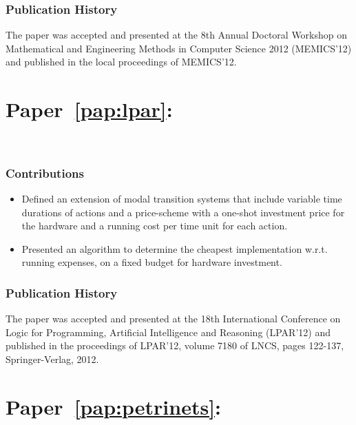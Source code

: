 \subsubsection*{Publication History}

The paper was accepted and presented at the 8th Annual Doctoral Workshop on Mathematical and Engineering Methods in Computer Science 2012 (MEMICS'12) and published in the local proceedings of MEMICS'12.


\newpage

\section*{Paper~\ref{pap:lpar}: \lpar}
\nikola \jan \kim \\ \mhm \jiri
\vspace{3mm}

\noindent

\subsubsection*{Contributions}

\begin{itemize}
\item Defined an extension of modal transition systems that include variable time durations of actions and a price-scheme with a one-shot investment price for the hardware and a running cost per time unit for each action.
\item Presented an algorithm to determine the cheapest implementation w.r.t. running expenses, on a fixed budget for hardware investment.  
\end{itemize}

\subsubsection*{Publication History}

The paper was accepted and presented at the 18th International Conference on Logic for Programming, Artificial Intelligence and Reasoning (LPAR'12) and published in the proceedings of LPAR'12, volume 7180 of LNCS, pages 122-137, Springer-Verlag, 2012.




\newpage

\section*{Paper~\ref{pap:petrinets}: \petrinets}
\serge \rolf \mhm
\vspace{3mm}


